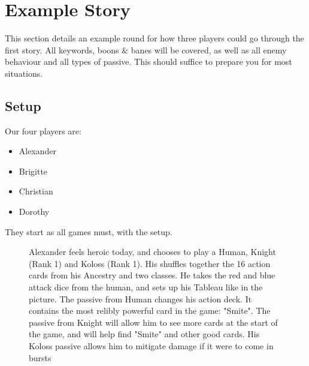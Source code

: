 \section{Example Story}




This section details an example round for how three players could go through the first story.
All keywords, boons \& banes will be covered, as well as all enemy behaviour and all types of passive.
This should suffice to prepare you for most situations.


\subsection{Setup}
Our four players are:
\begin{itemize}
	\item Alexander
	\item Brigitte
	\item Christian
	\item Dorothy
\end{itemize}

They start as all games must, with the setup.


\begin{figure}[ht]
	\begin{minipage}[t][6cm][t]{0.5\textwidth}
	\end{minipage}
	\begin{minipage}[t][6cm][t]{0.5\textwidth}
		
		Alexander feels heroic today, and chooses to play a Human, Knight (Rank 1) and Koloss (Rank 1). His shuffles together the 16 action cards from his Ancestry and two classes. He takes the red and blue attack dice from the human, and sets up his Tableau like in the picture. The passive from Human changes his action deck. It contains the most relibly powerful card in the game: "Smite". The passive from Knight will allow him to see more cards at the start of the game, and will help find "Smite" and other good cards. His Koloss passive allows him to mitigate damage if it were to come in bursts
		
	\end{minipage}	
	
\end{figure}

